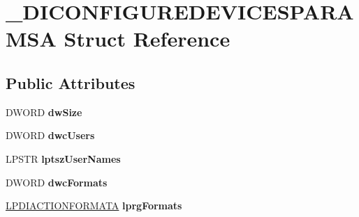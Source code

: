 \hypertarget{struct___d_i_c_o_n_f_i_g_u_r_e_d_e_v_i_c_e_s_p_a_r_a_m_s_a}{\section{\-\_\-\-D\-I\-C\-O\-N\-F\-I\-G\-U\-R\-E\-D\-E\-V\-I\-C\-E\-S\-P\-A\-R\-A\-M\-S\-A Struct Reference}
\label{struct___d_i_c_o_n_f_i_g_u_r_e_d_e_v_i_c_e_s_p_a_r_a_m_s_a}
}
\subsection*{Public Attributes}
\begin{DoxyCompactItemize}
\item 
\hypertarget{struct___d_i_c_o_n_f_i_g_u_r_e_d_e_v_i_c_e_s_p_a_r_a_m_s_a_a1638f421326f307ef39e9748e16d6539}{D\-W\-O\-R\-D {\bfseries dw\-Size}}\label{struct___d_i_c_o_n_f_i_g_u_r_e_d_e_v_i_c_e_s_p_a_r_a_m_s_a_a1638f421326f307ef39e9748e16d6539}

\item 
\hypertarget{struct___d_i_c_o_n_f_i_g_u_r_e_d_e_v_i_c_e_s_p_a_r_a_m_s_a_adbbc117bf9610a77409946dc715f6071}{D\-W\-O\-R\-D {\bfseries dwc\-Users}}\label{struct___d_i_c_o_n_f_i_g_u_r_e_d_e_v_i_c_e_s_p_a_r_a_m_s_a_adbbc117bf9610a77409946dc715f6071}

\item 
\hypertarget{struct___d_i_c_o_n_f_i_g_u_r_e_d_e_v_i_c_e_s_p_a_r_a_m_s_a_a49673856815f26a84fe8f22b395f729a}{L\-P\-S\-T\-R {\bfseries lptsz\-User\-Names}}\label{struct___d_i_c_o_n_f_i_g_u_r_e_d_e_v_i_c_e_s_p_a_r_a_m_s_a_a49673856815f26a84fe8f22b395f729a}

\item 
\hypertarget{struct___d_i_c_o_n_f_i_g_u_r_e_d_e_v_i_c_e_s_p_a_r_a_m_s_a_afed28921d8be8e9ec5ca2bf9ca4e59b8}{D\-W\-O\-R\-D {\bfseries dwc\-Formats}}\label{struct___d_i_c_o_n_f_i_g_u_r_e_d_e_v_i_c_e_s_p_a_r_a_m_s_a_afed28921d8be8e9ec5ca2bf9ca4e59b8}

\item 
\hypertarget{struct___d_i_c_o_n_f_i_g_u_r_e_d_e_v_i_c_e_s_p_a_r_a_m_s_a_a36069e06c28ad2d039a2a8fe6c986946}{\hyperlink{struct___d_i_a_c_t_i_o_n_f_o_r_m_a_t_a}{L\-P\-D\-I\-A\-C\-T\-I\-O\-N\-F\-O\-R\-M\-A\-T\-A} {\bfseries lprg\-Formats}}\label{struct___d_i_c_o_n_f_i_g_u_r_e_d_e_v_i_c_e_s_p_a_r_a_m_s_a_a36069e06c28ad2d039a2a8fe6c986946}


\end{DoxyCompactItemize}
